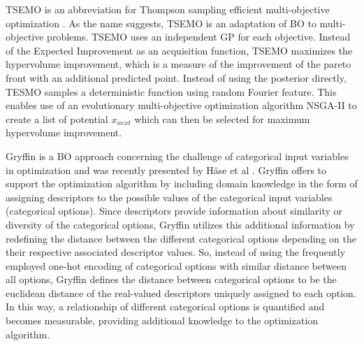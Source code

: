 TSEMO is an abbreviation for Thompson sampling efficient multi-objective optimization \cite{Bradford2018}. As the name suggests, TSEMO is an adaptation of BO to multi-objective problems. TSEMO uses an independent GP for each objective. Instead of the Expected Improvement as an acquisition function, TSEMO maximizes the hypervolume improvement, which is a measure of the improvement of the pareto front with an additional predicted point. Instead of using the posterior directly, TESMO samples a deterministic function using random Fourier feature. This enables use of an evolutionary multi-objective optimization algorithm NSGA-II \cite{Deb2002} to create a list of potential $x_{next}$ which can then be selected for maximum hypervolume improvement.

Gryffin is a BO approach concerning the challenge of categorical input variables in optimization and was recently presented by H{\"{a}}se et al \cite{Hase2020a}. Gryffin offers to support the optimization algorithm by including domain knowledge in the form of assigning descriptors to the possible values of the categorical input variables (categorical options). Since descriptors provide information about similarity or diversity of the categorical options, Gryffin utilizes this additional information by redefining the distance between the different categorical options depending on the their respective associated descriptor values. So, instead of using the frequently employed one-hot encoding of categorical options with similar distance between all options,  Gryffin defines the distance between categorical options to be the euclidean distance of the real-valued descriptors uniquely assigned to each option. In this way, a relationship of different categorical options is quantified and becomes measurable, providing additional knowledge to the optimization algorithm. 


